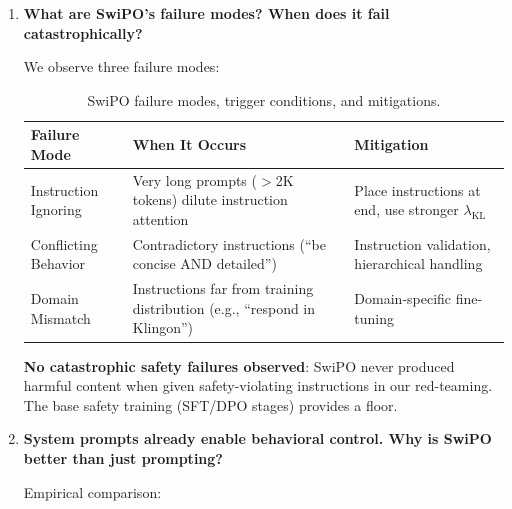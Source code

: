 \begin{enumerate}[label=\textbf{Q\arabic*.}, leftmargin=*, itemsep=8pt]
\item \textbf{What are SwiPO's failure modes? When does it fail catastrophically?}

 We observe three failure modes:

\begin{table}[ht!]
\centering
\normalsize
\renewcommand{\arraystretch}{1.2}
\begin{tabularx}{\textwidth}{@{}l>{\raggedright\arraybackslash}X>{\raggedright\arraybackslash}X@{}}
\toprule
\textbf{Failure Mode} & \textbf{When It Occurs} & \textbf{Mitigation} \\
\midrule
Instruction Ignoring & Very long prompts ($>$2K tokens) dilute instruction attention & Place instructions at end, use stronger $\lambda_{\text{KL}}$ \\ \hline
Conflicting Behavior & Contradictory instructions (``be concise AND detailed'') & Instruction validation, hierarchical handling \\ \hline
Domain Mismatch & Instructions far from training distribution (e.g., ``respond in Klingon'') & Domain-specific fine-tuning \\
\bottomrule
\end{tabularx}
\caption{SwiPO failure modes, trigger conditions, and mitigations.}
\label{tab:faq_failure_modes}
\end{table}

\textbf{No catastrophic safety failures observed}: SwiPO never produced harmful content when given safety-violating instructions in our red-teaming. The base safety training (SFT/DPO stages) provides a floor.

\vspace{4mm}

\item \textbf{System prompts already enable behavioral control. Why is SwiPO better than just prompting?}

 Empirical comparison:

\begin{table}[ht!]
\centering
\normalsize
\renewcommand{\arraystretch}{1.2}
\caption{SwiPO vs prompting baselines on ECLIPTICA and robustness.}
\label{tab:faq_cita_vs_prompting}
\end{table}


\end{enumerate}

